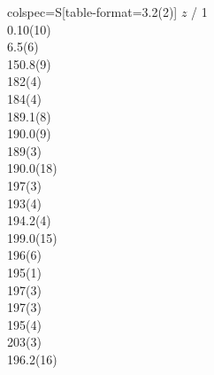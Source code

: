 \begin{tblr}{colspec={S[table-format=3.2(2)]}}
{{{$z$ / \si{1}}}}\\
0.10(10)\\
6.5(6)\\
150.8(9)\\
182(4)\\
184(4)\\
189.1(8)\\
190.0(9)\\
189(3)\\
190.0(18)\\
197(3)\\
193(4)\\
194.2(4)\\
199.0(15)\\
196(6)\\
195(1)\\
197(3)\\
197(3)\\
195(4)\\
203(3)\\
196.2(16)\\
\end{tblr}
